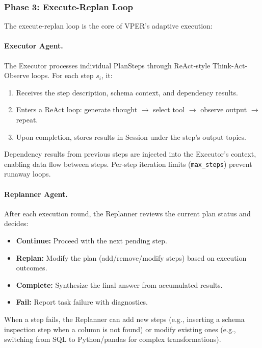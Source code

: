 \documentclass{article}
\begin{document}
\subsubsection{Phase 3: Execute-Replan Loop}

The execute-replan loop is the core of VPER's adaptive execution:

\paragraph{Executor Agent.}
The Executor processes individual PlanSteps through ReAct-style Think-Act-Observe loops.
For each step $s_i$, it:
\begin{enumerate}[leftmargin=1.5em]
    \item Receives the step description, schema context, and dependency results.
    \item Enters a ReAct loop: generate thought $\to$ select tool $\to$ observe output $\to$ repeat.
    \item Upon completion, stores results in Session under the step's output topics.
\end{enumerate}

Dependency results from previous steps are injected into the Executor's context, enabling data flow between steps.
Per-step iteration limits (\texttt{max\_steps}) prevent runaway loops.

\paragraph{Replanner Agent.}
After each execution round, the Replanner reviews the current plan status and decides:
\begin{itemize}[leftmargin=1.5em]
    \item \textbf{Continue:} Proceed with the next pending step.
    \item \textbf{Replan:} Modify the plan (add/remove/modify steps) based on execution outcomes.
    \item \textbf{Complete:} Synthesize the final answer from accumulated results.
    \item \textbf{Fail:} Report task failure with diagnostics.
\end{itemize}

When a step fails, the Replanner can add new steps (e.g., inserting a schema inspection step when a column is not found) or modify existing ones (e.g., switching from SQL to Python/pandas for complex transformations).
\end{document}

